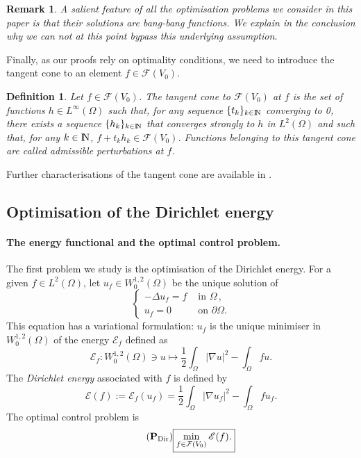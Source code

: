 \documentclass{article}
\newcommand{\N}{\textnormal{I\kern-0.21emN}}
\newtheorem{definition}[material]{Definition}
\newtheorem{remark}[material]{Remark}
\def\O{{\Omega}}
\def\n{{\nabla}}
\numberwithin{equation}{section}
\begin{document}
\begin{remark}\label{Re:MaxBangbang}
A salient feature of all the optimisation problems we consider in this paper is that their solutions are bang-bang functions. We explain in the conclusion why we can not at this point bypass this underlying assumption.
\end{remark}
Finally, as our proofs rely on optimality conditions, we need to introduce the tangent cone to an element $f\in \mathcal F(V_0)$. 
\begin{definition}\label{De:Admissible}
Let $f \in \mathcal F(V_0)$. The tangent cone to $\mathcal F(V_0)$ at $f$ is the set of functions $h\in L^\infty(\O)$ such that, for any sequence $\{t_k\}_{k\in \N}$ converging to 0, there exists a sequence $\{h_k\}_{k\in \N}$ that converges strongly to $h$ in $L^2(\O)$ and such that, for any $k\in \N$, $f+t_kh_k\in \mathcal F(V_0)$. Functions belonging to this tangent cone are called admissible perturbations at $f$.
\end{definition}
Further characterisations of the tangent cone are available in \cite{bednarczuk:inria-00073499,CominettiPenot}.





\subsection{Optimisation of the Dirichlet energy}\label{Se:IntroDirichlet}
\paragraph{The energy functional and the optimal control problem.}
The first problem we study is the optimisation of the Dirichlet energy. For a given $f\in L^2(\O)$, let $u_f\in W^{1,2}_0(\O)$ be the unique solution of 
\begin{equation}\label{Eq:Main}\begin{cases}
-\Delta u_f=f&\text{ in }\O\,, 
\\ u_f=0&\text{ on }\partial \O.\end{cases}\end{equation} This equation has a variational formulation: $u_f$ is the unique minimiser in $W^{1,2}_0(\O)$ of the energy $\mathcal E_f$ defined as 
\[ \mathcal E_f:W^{1,2}_0(\O)\ni u\mapsto \frac12\int_\O |\n u|^2-\int_\O fu.\]
The \emph{Dirichlet energy} associated with $f$ is defined by
\begin{equation}\label{Eq:DirichletEnergy} \mathscr E(f):=\mathcal E_f(u_f)=\frac12\int_\O |\n u_f|^2-\int_\O fu_f.\end{equation} The optimal control problem is 
\begin{equation}\label{Pv:Dirichlet}\tag{$\bold{P}_{\mathrm{Dir}}$}
\fbox{$\displaystyle \min_{f\in \mathcal F(V_0)}\mathscr E(f).
$}
\end{equation}
\end{document}
